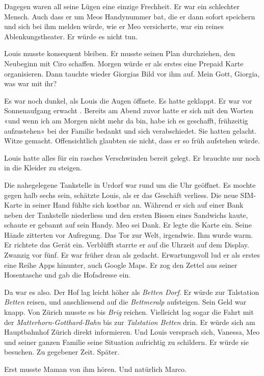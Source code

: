 Dagegen waren all seine Lügen eine einzige Frechheit. Er war ein
schlechter Mensch. Auch dass er um Meos Handynummer bat, die er dann
sofort speichern und sich bei ihm melden würde, wie er Meo versicherte,
war ein reines Ablenkungstheater. Er würde es nicht tun.

Louis musste konsequent bleiben. Er musste seinen Plan durchziehen, den
Neubeginn mit Ciro schaffen. Morgen würde er als erstes eine Prepaid
Karte organisieren. Dann tauchte wieder Giorgias Bild vor ihm auf. Mein
Gott, Giorgia, was war mit ihr?

Es war noch dunkel, als Louis die Augen öffnete. Es hatte geklappt. Er
war vor Sonnenaufgang erwacht . Bereits am Abend zuvor hatte er sich mit
den Worten «und wenn ich am Morgen nicht mehr da bin, habe ich es
geschafft, frühzeitig aufzustehen» bei der Familie bedankt und sich
verabschiedet. Sie hatten gelacht. Witze gemacht. Offensichtlich
glaubten sie nicht, dass er so früh aufstehen würde.

Louis hatte alles für ein rasches Verschwinden bereit gelegt. Er
brauchte nur noch in die Kleider zu steigen.

Die nahegelegene Tankstelle in Urdorf war rund um die Uhr geöffnet. Es
mochte gegen halb sechs sein, schätzte Louis, als er das Geschäft
verliess. Die neue SIM-Karte in seiner Hand fühlte sich kostbar an.
Während er sich auf einer Bank neben der Tankstelle niederliess und den
ersten Bissen eines Sandwichs kaute, schaute er gebannt auf sein Handy.
Meo sei Dank. Er legte die Karte ein. Seine Hände zitterten vor
Aufregung. Das Tor zur Welt, irgendwie. Ihm wurde warm. Er richtete das
Gerät ein. Verblüfft starrte er auf die Uhrzeit auf dem Display. Zwanzig
vor fünf. Er war früher dran als gedacht. Erwartungsvoll lud er als
erstes eine Reihe Apps hinunter, auch Google Maps. Er zog den Zettel aus
seiner Hosentasche und gab die Hofadresse ein.

Da war es also. Der Hof lag leicht höher als \emph{Betten Dorf}. Er
würde zur Talstation \emph{Betten} reisen, und anschliessend auf die
\emph{Bettmeralp} aufsteigen. Sein Geld war knapp. Von Zürich musste es
bis \emph{Brig} reichen. Vielleicht lag sogar die Fahrt mit der
\emph{Matterhorn-Gotthard-Bahn} bis zur \emph{Talstation Betten} drin.
Er würde sich am Hauptbahnhof Zürich direkt informieren. Und Louis
versprach sich, Vanessa, Meo und seiner ganzen Familie seine Situation
aufrichtig zu schildern. Er würde sie besuchen. Zu gegebener Zeit.
Später.

Erst musste Maman von ihm hören. Und natürlich Marco.

